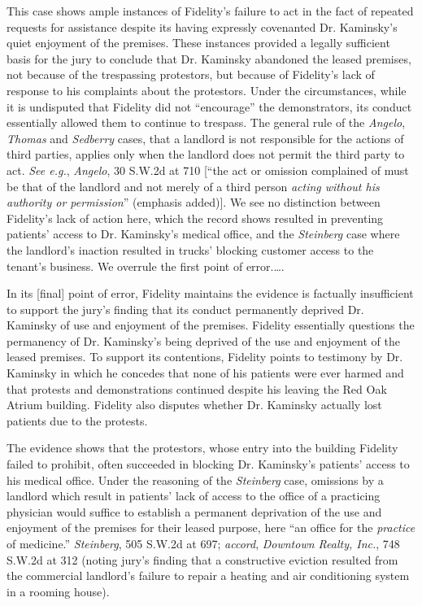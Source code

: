 This case shows ample instances of Fidelity's failure to act in the fact of
repeated requests for assistance despite its having expressly covenanted Dr.
Kaminsky's quiet enjoyment of the premises. These instances provided a legally
sufficient basis for the jury to conclude that Dr. Kaminsky abandoned the
leased premises, not because of the trespassing protestors, but because of
Fidelity's lack of response to his complaints about the protestors. Under the
circumstances, while it is undisputed that Fidelity did not ``encourage'' the
demonstrators, its conduct essentially allowed them to continue to trespass.
The general rule of the \textit{Angelo}, \textit{Thomas} and \textit{Sedberry}
cases, that a landlord is not responsible for the actions of third parties,
applies only when the landlord does not permit the third party to act.
\textit{See e.g.}, \textit{Angelo}, 30 S.W.2d at 710 [``the act or omission
complained of must be that of the landlord and not merely of a third person
\textit{acting without his authority or permission}'' (emphasis added)]. We
see no distinction between Fidelity's lack of action here, which the record
shows resulted in preventing patients' access to Dr. Kaminsky's medical office,
and the \textit{Steinberg} case where the landlord's inaction resulted in
trucks' blocking customer access to the tenant's business. We overrule the
first point of error.\ldots .

In its [final] point of error, Fidelity maintains the evidence is factually
insufficient to support the jury's finding that its conduct permanently
deprived Dr. Kaminsky of use and enjoyment of the premises. Fidelity
essentially questions the permanency of Dr. Kaminsky's being deprived of the
use and enjoyment of the leased premises. To support its contentions, Fidelity
points to testimony by Dr. Kaminsky in which he concedes that none of his
patients were ever harmed and that protests and demonstrations continued
despite his leaving the Red Oak Atrium building. Fidelity also disputes whether
Dr. Kaminsky actually lost patients due to the protests.

The evidence shows that the protestors, whose entry into the building Fidelity
failed to prohibit, often succeeded in blocking Dr. Kaminsky's patients' access
to his medical office. Under the reasoning of the \textit{Steinberg} case,
omissions by a landlord which result in patients' lack of access to the office
of a practicing physician would suffice to establish a permanent deprivation of
the use and enjoyment of the premises for their leased purpose, here ``an
office for the \textit{practice} of medicine.'' \textit{Steinberg}, 505 S.W.2d
at 697; \textit{accord}, \textit{Downtown Realty, Inc.}, 748 S.W.2d at 312
(noting jury's finding that a constructive eviction resulted from the
commercial landlord's failure to repair a heating and air conditioning system
in a rooming house).

